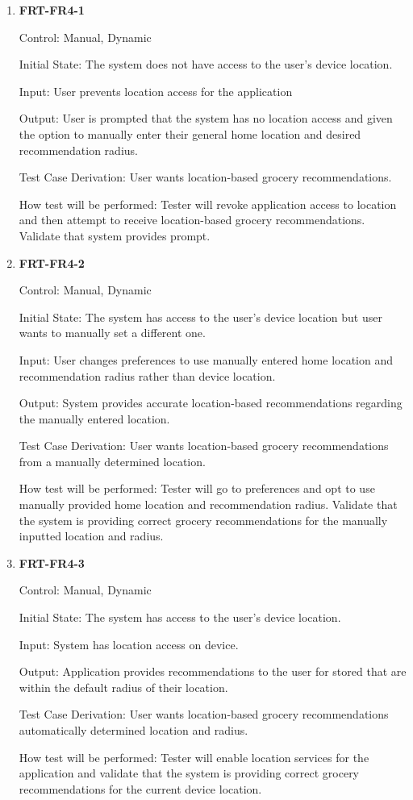 \documentclass[12pt, titlepage]{article}
\begin{document}
\begin{enumerate}

\item{\textbf{FRT-FR4-1}}

Control: Manual, Dynamic
          
Initial State: The system does not have access to the user's device location.

Input: User prevents location access for the application
          
Output: User is prompted that the system has no location access and given the option to manually enter their general home location and desired recommendation radius.

Test Case Derivation: User wants location-based grocery recommendations.
          
How test will be performed: Tester will revoke application access to location  and then attempt to receive location-based grocery recommendations. Validate that system provides prompt.

\item{\textbf{FRT-FR4-2}}

Control: Manual, Dynamic
          
Initial State: The system has access to the user's device location but user wants to manually set a different one.

Input: User changes preferences to use manually entered home location and recommendation radius rather than device location.
          
Output: System provides accurate location-based recommendations regarding the manually entered location.

Test Case Derivation: User wants location-based grocery recommendations from a manually determined location.
          
How test will be performed: Tester will go to preferences and opt to use manually provided home location and recommendation radius. Validate that the system is providing correct grocery recommendations for the manually inputted location and radius.

\item{\textbf{FRT-FR4-3}}

Control: Manual, Dynamic
          
Initial State: The system has access to the user's device location.

Input: System has location access on device.
          
Output: Application provides recommendations to the user for stored that are within the default radius of their location.

Test Case Derivation: User wants location-based grocery recommendations automatically determined location and radius.
          
How test will be performed: Tester will enable location services for the application and validate that the system is providing correct grocery recommendations for the current device location.

\end{enumerate}
\end{document}
